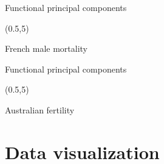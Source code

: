 \documentclass[14pt]{beamer}
\begin{document}
\begin{frame}{\large Functional principal components}

\begin{textblock}{2.5}(0.5,5)
\begin{block}{}
French male mortality
\end{block}
\end{textblock}


\end{frame}




\begin{frame}{\large Functional principal components}

\begin{textblock}{2.5}(0.5,5)
\begin{block}{}
Australian fertility
\end{block}
\end{textblock}

\end{frame}


\section{Data visualization}
\end{document}
